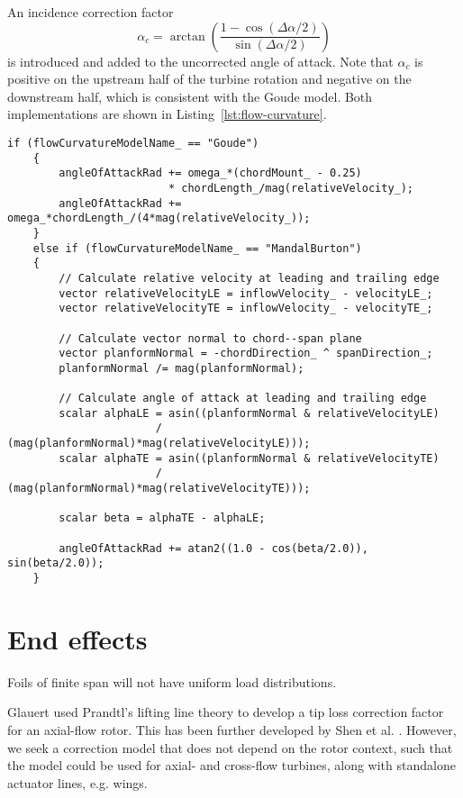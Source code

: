 An incidence correction factor
\begin{equation}
    \alpha_c = \arctan \left( \frac{1 - \cos (\Delta \alpha / 2)}{\sin (\Delta
        \alpha / 2)} \right)
    \label{eq:Mandal-Burton-alpha-corr}
\end{equation}
is introduced and added to the uncorrected angle of attack. Note that $\alpha_c$
is positive on the upstream half of the turbine rotation and negative on the
downstream half, which is consistent with the Goude model. Both implementations
are shown in Listing~\ref{lst:flow-curvature}.

\begin{lstlisting}[float,caption=Flow curvature model implementation.,label=lst:flow-curvature]
    if (flowCurvatureModelName_ == "Goude")
    {
        angleOfAttackRad += omega_*(chordMount_ - 0.25)
                         * chordLength_/mag(relativeVelocity_);
        angleOfAttackRad += omega_*chordLength_/(4*mag(relativeVelocity_));
    }
    else if (flowCurvatureModelName_ == "MandalBurton")
    {
        // Calculate relative velocity at leading and trailing edge
        vector relativeVelocityLE = inflowVelocity_ - velocityLE_;
        vector relativeVelocityTE = inflowVelocity_ - velocityTE_;
    
        // Calculate vector normal to chord--span plane
        vector planformNormal = -chordDirection_ ^ spanDirection_;
        planformNormal /= mag(planformNormal);
        
        // Calculate angle of attack at leading and trailing edge
        scalar alphaLE = asin((planformNormal & relativeVelocityLE)
                       / (mag(planformNormal)*mag(relativeVelocityLE)));
        scalar alphaTE = asin((planformNormal & relativeVelocityTE)
                       / (mag(planformNormal)*mag(relativeVelocityTE)));
        
        scalar beta = alphaTE - alphaLE;
        
        angleOfAttackRad += atan2((1.0 - cos(beta/2.0)), sin(beta/2.0));
    }
\end{lstlisting}


\section{End effects}

Foils of finite span will not have uniform load distributions.

Glauert used Prandtl's lifting line theory to develop a tip loss correction
factor for an axial-flow rotor. This has been further developed by Shen et al.
\cite{Shen2005a}. However, we seek a correction model that does not depend on
the rotor context, such that the model could be used for axial- and cross-flow
turbines, along with standalone actuator lines, e.g. wings.

